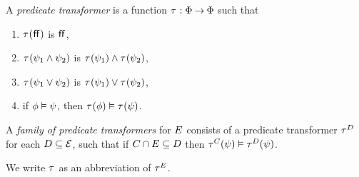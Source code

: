 \begin{definition}
  \label{def:trans}
  A \emph{predicate transformer} is a %
  function
  $\aTr{}{}:\Formulae\fun\Formulae$ such that
  \begin{multicols}{2}
    \begin{enumerate}[,label=(\textsc{x}\arabic*),ref=\textsc{x}\arabic*]
    \item \label{tr-false}
      $\aTr{}{\FALSE}$ is $\mkern.6mu\mathsf{ff}\mkern.6mu$,    
    \item \label{tr-and}
      $\aTr{}{\bForm_1\land\bForm_2}$ is $\aTr{}{\bForm_1}\land\aTr{}{\bForm_2}$,    
    \item \label{tr-or}
      $\aTr{}{\bForm_1\lor\bForm_2}$ is $\aTr{}{\bForm_1}\lor\aTr{}{\bForm_2}$, 
    \item \label{tr-implies}
      if $\phi \mathrel{\vDash} \psi$, then $\aTr{}{\aForm} \rimplies
      \aTr{}{\bForm}$.
    \end{enumerate}
  \end{multicols}
\end{definition}

\begin{definition}
  \label{def:family}
  A \emph{family of predicate transformers} for $E$ consists of a
  predicate transformer $\aTr{\bEvs}{}$ for each $D\subseteq\mathcal{E}$,
  such that if $C \cap E \subseteq D$ then
  $\aTr{\cEvs}{\bForm} \rimplies \aTr{\bEvs}{\bForm}$.

  We write $\aTr{}{}$ as an abbreviation of $\aTr{\aEvs}{}$.
\end{definition}

